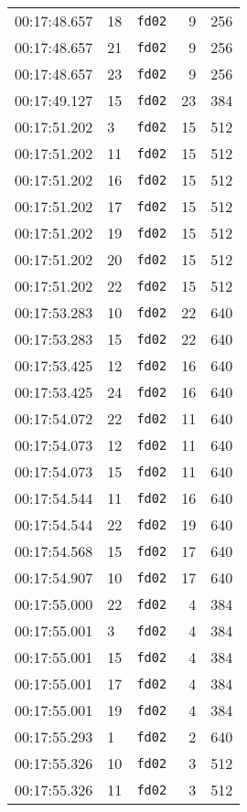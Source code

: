 \documentclass{article}
\begin{document}
\begin{longtable}{lllrr}
00:17:48.657 & 18 & \texttt{fd02} & 9 & 256 \\
00:17:48.657 & 21 & \texttt{fd02} & 9 & 256 \\
00:17:48.657 & 23 & \texttt{fd02} & 9 & 256 \\
00:17:49.127 & 15 & \texttt{fd02} & 23 & 384 \\
00:17:51.202 & 3 & \texttt{fd02} & 15 & 512 \\
00:17:51.202 & 11 & \texttt{fd02} & 15 & 512 \\
00:17:51.202 & 16 & \texttt{fd02} & 15 & 512 \\
00:17:51.202 & 17 & \texttt{fd02} & 15 & 512 \\
00:17:51.202 & 19 & \texttt{fd02} & 15 & 512 \\
00:17:51.202 & 20 & \texttt{fd02} & 15 & 512 \\
00:17:51.202 & 22 & \texttt{fd02} & 15 & 512 \\
00:17:53.283 & 10 & \texttt{fd02} & 22 & 640 \\
00:17:53.283 & 15 & \texttt{fd02} & 22 & 640 \\
00:17:53.425 & 12 & \texttt{fd02} & 16 & 640 \\
00:17:53.425 & 24 & \texttt{fd02} & 16 & 640 \\
00:17:54.072 & 22 & \texttt{fd02} & 11 & 640 \\
00:17:54.073 & 12 & \texttt{fd02} & 11 & 640 \\
00:17:54.073 & 15 & \texttt{fd02} & 11 & 640 \\
00:17:54.544 & 11 & \texttt{fd02} & 16 & 640 \\
00:17:54.544 & 22 & \texttt{fd02} & 19 & 640 \\
00:17:54.568 & 15 & \texttt{fd02} & 17 & 640 \\
00:17:54.907 & 10 & \texttt{fd02} & 17 & 640 \\
00:17:55.000 & 22 & \texttt{fd02} & 4 & 384 \\
00:17:55.001 & 3 & \texttt{fd02} & 4 & 384 \\
00:17:55.001 & 15 & \texttt{fd02} & 4 & 384 \\
00:17:55.001 & 17 & \texttt{fd02} & 4 & 384 \\
00:17:55.001 & 19 & \texttt{fd02} & 4 & 384 \\
00:17:55.293 & 1 & \texttt{fd02} & 2 & 640 \\
00:17:55.326 & 10 & \texttt{fd02} & 3 & 512 \\
00:17:55.326 & 11 & \texttt{fd02} & 3 & 512 \\

\end{longtable}
\end{document}
